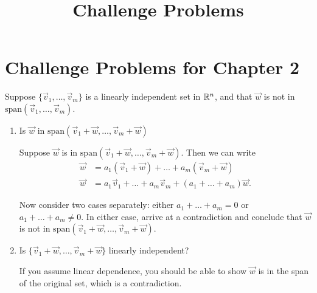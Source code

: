 \documentclass{ximera}
\title{Challenge Problems} \license{CC BY-NC-SA 4.0}
\begin{document}
\begin{abstract}
\end{abstract}
\maketitle

\section*{Challenge Problems for Chapter 2}

\begin{problem}\label{prob:Anna3.1}
    Suppose $\{\vec{v}_{1}, \dots , \vec{v}_{m}\}$ is a linearly independent set in $\mathbb{R}^n$, and that $\vec{w}$ is not in $\mbox{span}\left(\vec{v}_{1}, \dots , \vec{v}_{m}\right)$.

    \begin{enumerate}
        \item Is $\vec{w}$ in $\mbox{span}\left(\vec{v}_{1}+\vec{w}, \dots , \vec{v}_{m}+\vec{w}\right)$

                \begin{hint}
            Suppose $\vec{w}$ is in $\mbox{span}\left(\vec{v}_{1}+\vec{w}, \dots , \vec{v}_{m}+\vec{w}\right)$.  Then we can write
\begin{align*}
    \vec{w} &= a_1 (\vec{v}_{1}+\vec{w}) + \dots + a_m (\vec{v}_{m}+\vec{w}) \\
    \vec{w} &= a_1\vec{v}_{1} + \dots + a_m\vec{v}_{m}+ (a_1 + \dots + a_m)\vec{w}.
    \end{align*}

Now consider two cases separately: either $a_1 + \dots + a_m = 0$ or $a_1 + \dots + a_m \ne 0$.  In either case, arrive at a contradiction and conclude that $\vec{w}$ is not in $\mbox{span}\left(\vec{v}_{1}+\vec{w}, \dots , \vec{v}_{m}+\vec{w}\right)$.
        \end{hint}

\item Is $\{\vec{v}_{1}+\vec{w}, \dots , \vec{v}_{m}+\vec{w}\}$ linearly independent?


\begin{hint}
            If you assume linear dependence, you should be able to show $\vec{w}$ is in the span of the original set, which is a contradiction.
\end{hint}

    \end{enumerate}
\end{problem}
\end{document}
